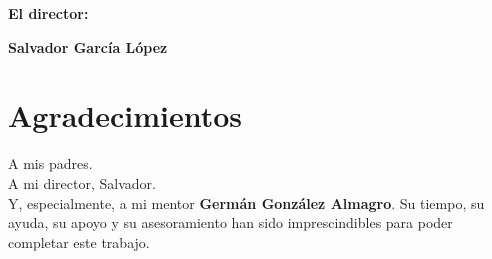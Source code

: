 \vspace{1cm}

\textbf{El director:}

\vspace{5cm}

\noindent \textbf{Salvador García López}

\chapter*{Agradecimientos}
\thispagestyle{empty}

       \vspace{1cm}


\begin{flushright}
	A mis padres. \\
	\vspace{0.35cm}
	A mi director, Salvador.\\
	\vspace{0.35cm}
	Y, especialmente, a mi mentor \textbf{Germán González Almagro}. Su tiempo, su ayuda, su apoyo y su asesoramiento han sido imprescindibles para poder completar este trabajo.
\end{flushright}


